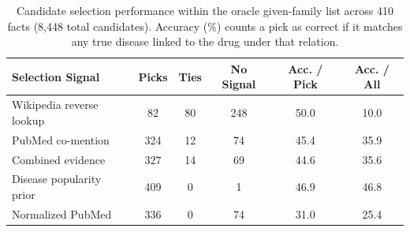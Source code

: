 \begin{table}[h]
\centering
\small
\setlength{\tabcolsep}{3pt}
\begin{tabular}{lccccc}
\toprule
Selection Signal & Picks & Ties & No Signal & Acc. / Pick & Acc. / All \\
\midrule
Wikipedia reverse lookup & 82 & 80 & 248 & 50.0 & 10.0 \\
PubMed co-mention & 324 & 12 & 74 & 45.4 & 35.9 \\
Combined evidence & 327 & 14 & 69 & 44.6 & 35.6 \\
Disease popularity prior & 409 & 0 & 1 & 46.9 & 46.8 \\
Normalized PubMed & 336 & 0 & 74 & 31.0 & 25.4 \\
\bottomrule
\end{tabular}
\caption{Candidate selection performance within the oracle given-family list across 410 facts (8,448 total candidates). Accuracy (\%) counts a pick as correct if it matches any true disease linked to the drug under that relation.}
\label{tab:signals}
\end{table}